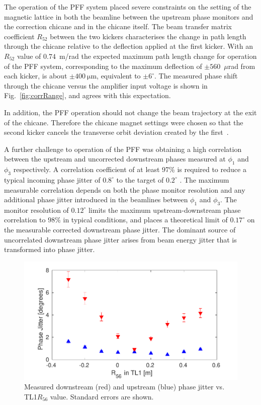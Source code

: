 \documentclass[%
 reprint,
 superscriptaddress,
 amsmath,
 amssymb,
 prl,
]{revtex4-1}
\begin{document}
The operation of the PFF system placed severe constraints on the setting of the 
magnetic lattice in both the beamline between the upstream phase monitors and 
the correction chicane and in  the chicane itself.
The beam transfer matrix coefficient \(R_{52}\) between the two kickers 
characterises the change in path length through the chicane relative to the 
deflection applied at the first kicker. 
With an \(R_{52}\) value of \(0.74\)~m/rad \cite{RobertsThesis} the expected 
maximum path length change for operation of the PFF system, corresponding to 
the maximum deflection of \(\pm560\)~\(\mu\)rad from each kicker, is about 
\(\pm400~\mathrm{\mu m}\), equivalent to \(\pm6^\circ\).
The measured phase shift through the chicane versus the amplifier input voltage 
is shown in Fig.~\ref{fig:corrRange}, and agrees with this expectation. 

In addition, the PFF operation should not change the beam trajectory at 
the exit of the chicane. Therefore the chicane magnet settings were chosen so 
that the second kicker cancels the transverse orbit deviation created by the 
first~\cite{RobertsThesis}.

A further challenge to operation of the PFF was obtaining a high correlation 
between the upstream and uncorrected downstream phases measured at \(\phi_1\) 
and \(\phi_3\) respectively. 
A correlation coefficient of at least 97\% is required to reduce a typical 
incoming phase jitter of \(0.8^\circ\) to the target of \(0.2^\circ\) 
\cite{RobertsThesis}. 
The maximum measurable correlation depends on both the phase monitor resolution 
and any additional phase jitter introduced in the beamlines between \(\phi_1\) 
and \(\phi_3\). The monitor resolution of \(0.12^\circ\) limits the maximum 
upstream-downstream phase correlation to \(98\%\) in typical conditions, and 
places a theoretical limit of \(0.17^\circ\) on the measurable corrected 
downstream phase jitter. 
The dominant source of uncorrelated downstream phase jitter arises from  
beam energy jitter that is transformed into phase jitter. 

\begin{figure}
	\includegraphics[width=\columnwidth]{figs/r56Scan}
	\caption{\label{fig:r56Scan}Measured downstream (red) and upstream (blue) 
	phase jitter vs. TL1\(R_{56}\) value. Standard errors are shown.
		}
\end{figure}
\end{document}
